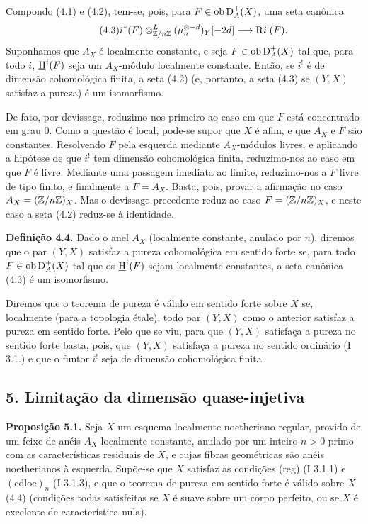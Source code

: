 Compondo (4.1) e (4.2), tem-se, pois, para $F\in\operatorname{ob}\mathrm{D}_A^+(X)$, uma seta canônica
\begin{equation}\tag{4.3}
        i^*(F)\otimes^L_{\mathbb{Z}/n\mathbb{Z}}(\mu_n^{\otimes -d})_Y[-2d]\longrightarrow \mathrm{R} i^!(F).
\end{equation}
Suponhamos que $A_X$ é localmente constante, e seja $F\in\operatorname{ob}\mathrm{D}_A^+(X)$ tal que, para todo $i$, $\underline{\mathrm H}^i(F)$ seja um $A_X$-módulo localmente constante. Então, se $i^!$ é de dimensão cohomológica finita, a seta (4.2) (e, portanto, a seta (4.3) se $(Y,X)$ satisfaz a pureza) é um isomorfismo.

De fato, por devissage, reduzimo-nos primeiro ao caso em que $F$ está concentrado em grau $0$. Como a questão é local, pode-se supor que $X$ é afim, e que $A_X$ e $F$ são constantes. Resolvendo $F$ pela esquerda mediante $A_X$-módulos livres, e aplicando a hipótese de que $i^!$ tem dimensão cohomológica finita, reduzimo-nos ao caso em que $F$ é livre. Mediante uma passagem imediata ao limite, reduzimo-nos a $F$ livre de tipo finito, e finalmente a $F=A_X$. Basta, pois, provar a afirmação no caso $A_X=(\mathbb{Z}/n\mathbb{Z})_X$. Mas o devissage precedente reduz ao caso $F=(\mathbb{Z}/n\mathbb{Z})_X$, e neste caso a seta (4.2) reduz-se à identidade.

\textbf{Definição 4.4.} Dado o anel $A_X$ (localmente constante, anulado por $n$), diremos que o par $(Y,X)$ satisfaz a pureza cohomológica em sentido forte se, para todo $F\in\operatorname{ob}\mathrm{D}_A^+(X)$ tal que os $\underline{\mathrm H}^i(F)$ sejam localmente constantes, a seta canônica (4.3) é um isomorfismo.

Diremos que o teorema de pureza é válido em sentido forte sobre $X$ se, localmente (para a topologia étale), todo par $(Y,X)$ como o anterior satisfaz a pureza em sentido forte. Pelo que se viu, para que $(Y,X)$ satisfaça a pureza no sentido forte basta, pois, que $(Y,X)$ satisfaça a pureza no sentido ordinário (I 3.1.) e que o funtor $i^!$ seja de dimensão cohomológica finita.

\subsection*{5. Limitação da dimensão quase-injetiva}

\textbf{Proposição 5.1.} Seja $X$ um esquema localmente noetheriano regular, provido de um feixe de anéis $A_X$ localmente constante, anulado por um inteiro $n>0$ primo com as características residuais de $X$, e cujas fibras geométricas são anéis noetherianos à esquerda. Supõe-se que $X$ satisfaz as condições (reg) (I 3.1.1) e $(\mathrm{cdloc})_n$ (I 3.1.3), e que o teorema de pureza em sentido forte é válido sobre $X$ (4.4) (condições todas satisfeitas se $X$ é suave sobre um corpo perfeito, ou se $X$ é excelente de característica nula).

